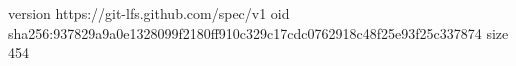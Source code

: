 version https://git-lfs.github.com/spec/v1
oid sha256:937829a9a0e1328099f2180ff910c329c17cdc0762918c48f25e93f25c337874
size 454
